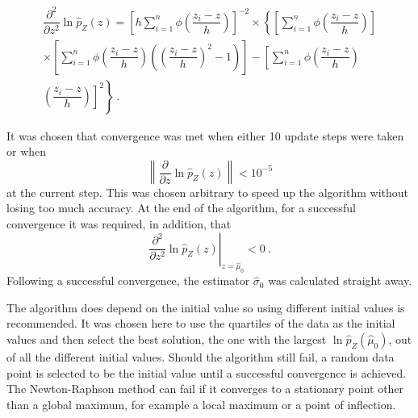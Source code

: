 \begin{multline}
  \dfrac{
    \partial^2
  }
  {
    \partial z^2
  }
  \ln\widehat{p}_Z(z)
  =
  \left[
    h\sum_{i=1}^n
    \phi\left(
      \dfrac{
        z_i-z
      }
      {
        h
      }
    \right)
  \right]^{-2}
  \times
  \left\{
    \left[
      \sum_{i=1}^n
      \phi\left(
        \dfrac{
          z_i-z
        }
        {
          h
        }
      \right)
    \right]
  \right.
  \\
  \left.
    \times
    \left[
      \sum_{i=1}^n
      \phi\left(
        \dfrac{
          z_i-z
        }
        {
          h
        }
      \right)
      \left(
        \left(
          \dfrac{
            z_i-z
          }
          {
            h
          }
        \right)^2
        -1
      \right)
    \right]
    -
    \left[
      \sum_{i=1}^n
      \phi\left(
        \dfrac{
          z_i-z
        }
        {
          h
        }
      \right)
    \right.
  \right.
  \\
  \left.
    \left.
      \left(
        \dfrac{
          z_i-z
        }
        {
          h
        }
      \right)
    \right]^2
  \right\}
  \ .
\end{multline}

It was chosen that convergence was met when either 10 update steps were taken or when
\begin{equation}
  \left\|
    \dfrac{
      \partial
    }
    {
      \partial z
    }
  \ln\widehat{p}_Z(z)
  \right\|
  <10^{-5}
\end{equation}
at the current step. This was chosen arbitrary to speed up the algorithm without losing too much accuracy. At the end of the algorithm, for a successful convergence it was required, in addition, that
\begin{equation}
  \left.
    \dfrac{
      \partial^2
    }
    {
      \partial z^2
    }
    \ln\widehat{p}_Z(z)
  \right|_{z=\widehat{\mu}_0}
  < 0 \ .
\end{equation}
Following a successful convergence, the estimator $\widehat{\sigma}_0$ was calculated straight away.

The algorithm does depend on the initial value so using different initial values is recommended. It was chosen here to use the quartiles of the data as the initial values and then select the best solution, the one with the largest $\ln\widehat{p}_Z\left(\widehat{\mu}_0\right)$, out of all the different initial values. Should the algorithm still fail, a random data point is selected to be the initial value until a successful convergence is achieved. The Newton-Raphson method can fail if it converges to a stationary point other than a global maximum, for example a local maximum or a point of inflection. 

